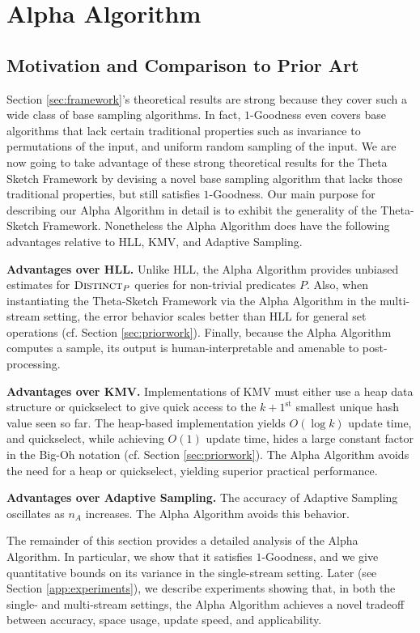 \documentclass{article}
\newcommand{\distinct}{\textsc{Distinct}}
\begin{document}
\section{Alpha Algorithm}
\label{sec:alpha}
\subsection{Motivation and Comparison to Prior Art}
Section \ref{sec:framework}'s
theoretical results 
are strong because they cover such a wide class of base sampling algorithms. In fact, $1$-Goodness even 
covers base algorithms that lack certain traditional properties such as invariance to permutations of the 
input, and uniform random sampling of the input. We are now going to take advantage of these strong
theoretical results for the Theta Sketch Framework by devising a novel base sampling algorithm that lacks those traditional
properties, but still satisfies $1$-Goodness. Our main purpose for describing our Alpha Algorithm in detail
is to exhibit the generality of the Theta-Sketch Framework. Nonetheless the Alpha Algorithm does have the following advantages relative to HLL, KMV, and Adaptive Sampling.

\medskip
\noindent \textbf{Advantages over HLL.} Unlike HLL,
the Alpha Algorithm provides unbiased estimates for
$\distinct_P$ queries for non-trivial predicates $P$. Also, when instantiating the Theta-Sketch Framework
via the Alpha Algorithm in the multi-stream setting, the error behavior scales better than HLL for general set operations (cf. Section \ref{sec:priorwork}). Finally,
because the Alpha Algorithm computes a sample, its output is human-interpretable and amenable to post-processing. 

\medskip
\noindent \textbf{Advantages over KMV.} Implementations of KMV must either use a heap data structure or quickselect \cite{quickselect61} to give quick access to the 
$k\!+\!1^{\text{st}}$
smallest unique
hash value seen so far. The heap-based implementation yields $O(\log k)$ update time, and quickselect, while achieving $O(1)$ update time, hides a large constant factor in the Big-Oh notation
(cf. Section \ref{sec:priorwork}).  
The Alpha Algorithm avoids the need for a heap or quickselect, yielding superior practical performance. 


\medskip
\noindent \textbf{Advantages over Adaptive Sampling.} The accuracy of Adaptive Sampling oscillates as $n_A$ increases. The Alpha Algorithm avoids this
behavior. 

\medskip
The remainder of this section provides a detailed analysis of the Alpha Algorithm. In particular, we show that it satisfies $1$-Goodness, and 
we give quantitative bounds on its variance in the single-stream setting. 
Later (see Section \ref{app:experiments}), we describe experiments showing that, in both the single- and multi-stream settings, the Alpha Algorithm
achieves a novel tradeoff between accuracy, space usage, update speed, and applicability. 
\end{document}
